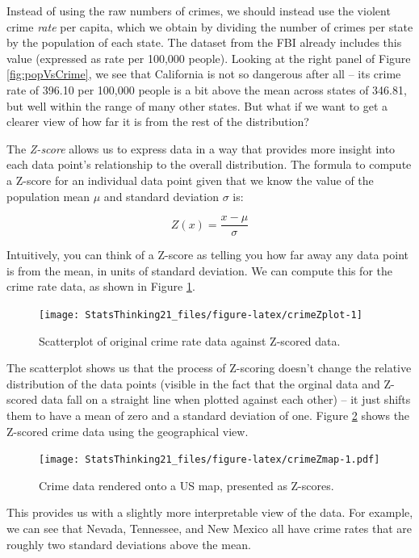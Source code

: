 \documentclass[12pt,]{book}
\theoremstyle{definition}
\theoremstyle{definition}
\theoremstyle{definition}
\theoremstyle{remark}
\begin{document}
Instead of using the raw numbers of crimes, we should instead use the violent crime \emph{rate} per capita, which we obtain by dividing the number of crimes per state by the population of each state. The dataset from the FBI already includes this value (expressed as rate per 100,000 people). Looking at the right panel of Figure \ref{fig:popVsCrime}, we see that California is not so dangerous after all -- its crime rate of 396.10 per 100,000 people is a bit above the mean across states of 346.81, but well within the range of many other states. But what if we want to get a clearer view of how far it is from the rest of the distribution?

The \emph{Z-score} allows us to express data in a way that provides more insight into each data point's relationship to the overall distribution. The formula to compute a Z-score for an individual data point given that we know the value of the population mean \(\mu\) and standard deviation \(\sigma\) is:

\[
Z(x) = \frac{x - \mu}{\sigma}
\]

Intuitively, you can think of a Z-score as telling you how far away any data point is from the mean, in units of standard deviation. We can compute this for the crime rate data, as shown in Figure \ref{fig:crimeZplot}.

\begin{figure}
\texttt{[image: StatsThinking21\_files/figure-latex/crimeZplot-1]} \caption{Scatterplot of original crime rate data against Z-scored data.}\label{fig:crimeZplot}
\end{figure}

The scatterplot shows us that the process of Z-scoring doesn't change the relative distribution of the data points (visible in the fact that the orginal data and Z-scored data fall on a straight line when plotted against each other) -- it just shifts them to have a mean of zero and a standard deviation of one. Figure \ref{fig:crimeZmap} shows the Z-scored crime data using the geographical view.

\begin{figure}
\centering
\texttt{[image: StatsThinking21\_files/figure-latex/crimeZmap-1.pdf]}
\caption{\label{fig:crimeZmap}Crime data rendered onto a US map, presented as Z-scores.}
\end{figure}

This provides us with a slightly more interpretable view of the data. For example, we can see that Nevada, Tennessee, and New Mexico all have crime rates that are roughly two standard deviations above the mean.
\end{document}
